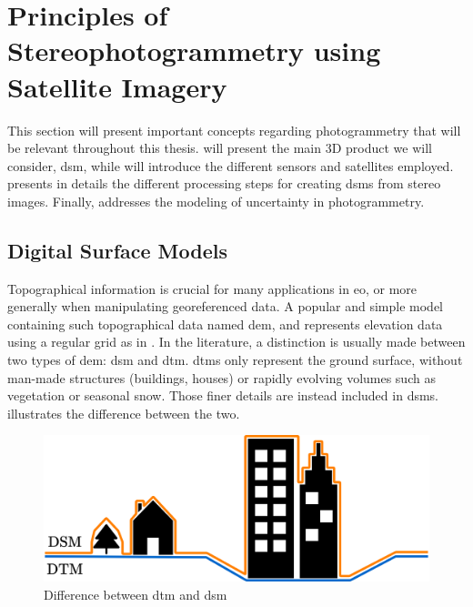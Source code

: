 \chapter{Principles of Stereophotogrammetry using Satellite Imagery}\label{chap:stereophotogrammetry}

This section will present important concepts regarding photogrammetry that will be relevant throughout this thesis.  will present the main 3D product we will consider, \ie \acrshort{dsm}, while  will introduce the different sensors and satellites employed.  presents in details the different processing steps for creating \acrshort{dsm}s from stereo images. Finally,  addresses the modeling of uncertainty in photogrammetry.

\section{Digital Surface Models}\label{sec:dsm}
Topographical information is crucial for many applications in \acrfull{eo}, or more generally when manipulating georeferenced data. A popular and simple model containing such topographical data named \acrlong{dem}, and represents elevation data using a regular grid as in . In the literature, a distinction is usually made between two types of \acrshort{dem}: \acrlong{dsm} and \acrlong{dtm}. \acrshort{dtm}s only represent the ground surface, without man-made structures (buildings, houses) or rapidly evolving volumes such as vegetation or seasonal snow. Those finer details are instead included in \acrshort{dsm}s.  illustrates the difference between the two.

\begin{figure}
    \centering
    \includegraphics[width=0.8\linewidth]{Images/Chap_1/DTM_DSM.png}
    \caption{Difference between \acrlong{dtm} and \acrlong{dsm}}
    \label{fig:DTM_DSM}
\end{figure}

